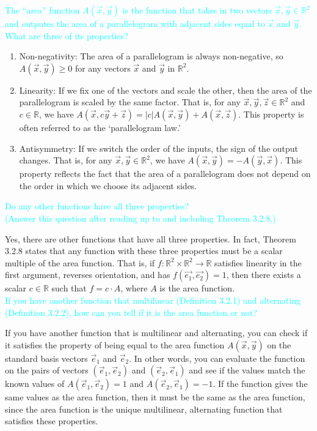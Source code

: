 \documentclass[fontsize=12pt]{scrartcl}
\begin{document}
\noindent
\textcolor{cyan}{The ``area'' function $A(\vec{x},\vec{y})$ is the function that takes in two vectors $\vec{x}, \vec{y} \in \mathbb{R}^2$ and outputes the area of a parallelogram with adjacent sides equal to $\vec{x}$ and $\vec{y}$. What are three of its properties?}

\begin{enumerate}
	\item Non-negativity: The area of a parallelogram is always non-negative, so $A(\vec{x},\vec{y}) \geq 0$ for any vectors $\vec{x}$ and $\vec{y}$ in $\mathbb{R}^2$.
	\item Linearity: If we fix one of the vectors and scale the other, then the area of the parallelogram is scaled by the same factor. That is, for any $\vec{x}, \vec{y}, \vec{z} \in \mathbb{R}^2$ and $c \in \mathbb{R}$, we have $A(\vec{x}, c\vec{y}+\vec{z}) = |c|A(\vec{x},\vec{y}) + A(\vec{x},\vec{z})$. This property is often referred to as the `parallelogram law.'
	\item Antisymmetry: If we switch the order of the inputs, the sign of the output changes. That is, for any $\vec{x}, \vec{y} \in \mathbb{R}^2$, we have $A(\vec{x},\vec{y}) = -A(\vec{y},\vec{x})$. This property reflects the fact that the area of a parallelogram does not depend on the order in which we choose its adjacent sides.
\end{enumerate}

 \noindent
\textcolor{cyan}{Do any other functions have all three properties?}\\\textcolor{cyan}{(Answer this question after reading up to and including Theorem 3.2.8.)}

\noindent
Yes, there are other functions that have all three properties. In fact, Theorem 3.2.8 states that any function with these three properties must be a scalar multiple of the area function. That is, if $f: \mathbb{R}^2 \times \mathbb{R}^2 \to \mathbb{R}$ satisfies linearity in the first argument, reverses orientation, and has $f(\vec{e_1}, \vec{e_2}) = 1$, then there exists a scalar $c \in \mathbb{R}$ such that $f = c \cdot A$, where $A$ is the area function.
\\

\noindent
\textcolor{cyan}{If you have another function that multilinear (Definition 3.2.1) and alternating (Definition 3.2.2), how can you tell if it is the area function or not?}

\noindent
If you have another function that is multilinear and alternating, you can check if it satisfies the property of being equal to the area function $A(\vec{x}, \vec{y})$ on the standard basis vectors $\vec{e}_1$ and $\vec{e}_2$. In other words, you can evaluate the function on the pairs of vectors $(\vec{e}_1, \vec{e}_2)$ and $(\vec{e}_2, \vec{e}_1)$ and see if the values match the known values of $A(\vec{e}_1, \vec{e}_2) = 1$ and $A(\vec{e}_2, \vec{e}_1) = -1$. If the function gives the same values as the area function, then it must be the same as the area function, since the area function is the unique multilinear, alternating function that satisfies these properties.
\end{document}
